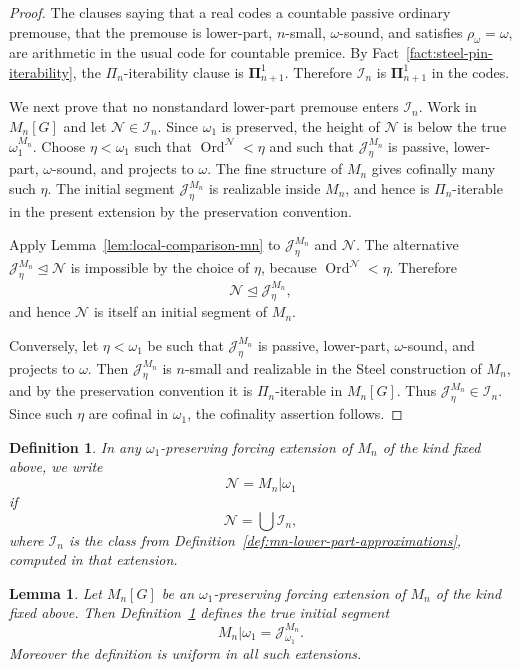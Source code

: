 \documentclass[a4paper,11pt]{article}
\newtheorem{lemma}[theorem]{Lemma}
\newtheorem{definition}[theorem]{Definition}
\begin{document}
\begin{proof}
The clauses saying that a real codes a countable passive ordinary premouse, that the premouse is lower-part, $n$-small, $\omega$-sound, and satisfies $\rho_\omega=\omega$, are arithmetic in the usual code for countable premice.  By Fact~\ref{fact:steel-pin-iterability}, the $\Pi_n$-iterability clause is $\boldsymbol{\Pi}^1_{n+1}$.  Therefore $\mathcal I_n$ is $\boldsymbol{\Pi}^1_{n+1}$ in the codes.

We next prove that no nonstandard lower-part premouse enters $\mathcal I_n$.  Work in $M_n[G]$ and let $\mathcal N\in\mathcal I_n$.  Since $\omega_1$ is preserved, the height of $\mathcal N$ is below the true $\omega_1^{M_n}$.  Choose $\eta<\omega_1$ such that $\operatorname{Ord}^{\mathcal N}<\eta$ and such that $\mathcal J^{M_n}_\eta$ is passive, lower-part, $\omega$-sound, and projects to $\omega$.  The fine structure of $M_n$ gives cofinally many such $\eta$.  The initial segment $\mathcal J^{M_n}_\eta$ is realizable inside $M_n$, and hence is $\Pi_n$-iterable in the present extension by the preservation convention.

Apply Lemma~\ref{lem:local-comparison-mn} to $\mathcal J^{M_n}_\eta$ and $\mathcal N$.  The alternative $\mathcal J^{M_n}_\eta\trianglelefteq\mathcal N$ is impossible by the choice of $\eta$, because $\operatorname{Ord}^{\mathcal N}<\eta$.  Therefore
\[
   \mathcal N\trianglelefteq \mathcal J^{M_n}_\eta,
\]
and hence $\mathcal N$ is itself an initial segment of $M_n$.

Conversely, let $\eta<\omega_1$ be such that $\mathcal J^{M_n}_\eta$ is passive, lower-part, $\omega$-sound, and projects to $\omega$.  Then $\mathcal J^{M_n}_\eta$ is $n$-small and realizable in the Steel construction of $M_n$, and by the preservation convention it is $\Pi_n$-iterable in $M_n[G]$.  Thus $\mathcal J^{M_n}_\eta\in\mathcal I_n$.  Since such $\eta$ are cofinal in $\omega_1$, the cofinality assertion follows.
\end{proof}

\begin{definition}\label{def:recover-mn-omega1}
In any $\omega_1$-preserving forcing extension of $M_n$ of the kind fixed above, we write
\[
   \mathcal N=M_n|\omega_1
\]
if
\[
   \mathcal N=\bigcup\mathcal I_n,
\]
where $\mathcal I_n$ is the class from Definition~\ref{def:mn-lower-part-approximations}, computed in that extension.
\end{definition}

\begin{lemma}\label{lem:recover-mn-omega1}
Let $M_n[G]$ be an $\omega_1$-preserving forcing extension of $M_n$ of the kind fixed above.  Then Definition~\ref{def:recover-mn-omega1} defines the true initial segment
\[
   M_n|\omega_1=\mathcal J^{M_n}_{\omega_1}.
\]
Moreover the definition is uniform in all such extensions.
\end{lemma}
\end{document}
